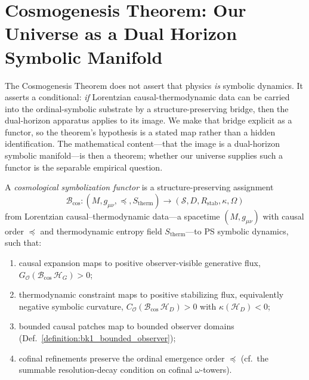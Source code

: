 \section[Cosmogenesis Theorem]{Cosmogenesis Theorem: Our Universe as a Dual Horizon Symbolic Manifold}
\label{sec:bk1_cosmogenisis_theorem}

The Cosmogenesis Theorem does not assert that physics \emph{is} symbolic
dynamics. It asserts a conditional: \emph{if} Lorentzian causal-thermodynamic
data can be carried into the ordinal-symbolic substrate by a structure-preserving
bridge, then the dual-horizon apparatus applies to its image. We make that bridge
explicit as a functor, so the theorem's hypothesis is a stated map rather than a
hidden identification. The mathematical content---that the image is a
dual-horizon symbolic manifold---is then a theorem; whether our universe supplies
such a functor is the separable empirical question.

\begin{definition}
\label{definition:bk1_cosmological_symbolization_functor}
A \emph{cosmological symbolization functor} is a structure-preserving assignment
\[
\mathcal{B}_{\mathrm{cos}}:
(M, g_{\mu\nu}, \preceq, S_{\mathrm{therm}})
\longrightarrow
(\mathcal{S}, D, R_{\mathrm{stab}}, \kappa, \Omega)
\]
from Lorentzian causal--thermodynamic data---a spacetime $(M,g_{\mu\nu})$ with
causal order $\preceq$ and thermodynamic entropy field $S_{\mathrm{therm}}$---to
PS symbolic dynamics, such that:
\begin{enumerate}
\item causal expansion maps to positive observer-visible generative flux,
$G_{\mathcal{O}}(\mathcal{B}_{\mathrm{cos}}\,\mathcal{H}_G)>0$;
\item thermodynamic constraint maps to positive stabilizing flux, equivalently
negative symbolic curvature,
$C_{\mathcal{O}}(\mathcal{B}_{\mathrm{cos}}\,\mathcal{H}_D)>0$ with
$\kappa(\mathcal{H}_D)<0$;
\item bounded causal patches map to bounded observer domains (Def.~\ref{definition:bk1_bounded_observer});
\item cofinal refinements preserve the ordinal emergence order $\preceq$
(cf.~the summable resolution-decay condition on cofinal $\omega$-towers).
\end{enumerate}
\end{definition}

